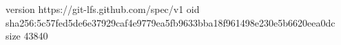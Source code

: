 version https://git-lfs.github.com/spec/v1
oid sha256:5c57fed5de6e37929caf4e9779ea5fb9633bba18f961498e230e5b6620eea0dc
size 43840
